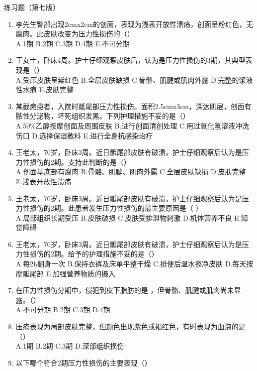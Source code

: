 \documentclass[11pt, a4paper]{ctexart}
\begin{document}
\begin{examplebox}{练习题（第七版）}
	\begin{enumerate}
		\item 李先生臀部出现2cmx2cm的创面，表现为浅表开放性溃疡，创面呈粉红色，无腐肉。此皮肤改变为压力性损伤的（\qquad）\\
		      A.1期 \quad B.2期 \quad C.3期 \quad D.4期 \quad E.不可分期
		\item 王女士，卧床4周。护士仔细观察皮肤后，认为是压力性损伤的3期，其典型表现是（\qquad）\\
		      A.受压皮肤呈紫红色 \quad B.全层皮肤缺损 \quad C.骨骼、肌腱或肌肉外露 \quad D.完整的浆液性水疱 \quad E.皮肤完整
		\item 某截瘫患者，入院时骶尾部压力性损伤。面积2.5cmx3cm，深达肌层，创面有脓性分泌物，坏死组织发黑。下列护理措施不妥的是（\qquad）\\
		      A.50\%乙醇按摩创面及周围皮肤 \quad B.进行创面清创处理 \quad C.用过氧化氢溶液冲洗伤口 \quad D.选择保湿敷料 \quad E.进行全身抗感染治疗
		\item 王老太，70岁，卧床3周。近日骶尾部皮肤有破溃，护士仔细观察后认为是压力性损伤的2期。支持此判断的是（\qquad）\\
		      A.创面基底部有腐肉 \quad B.骨骼、肌腱、肌肉外露 \quad C.全层皮肤缺损 \quad D.皮肤完整 \quad E.浅表开放性溃疡
		\item 王老太，70岁，卧床3周。近日骶尾部皮肤有破溃，护士仔细观察后认为是压力性损伤的2期。此患者发生压力性损伤的最主要原因是（ ）\\
		      A.局部组织长期受压 \quad B.皮肤破损 \quad C.皮肤受排泄物刺激 \quad D.机体营养不良 \quad E.知觉障碍
		\item 王老太，70岁，卧床3周。近日骶尾部皮肤有破溃，护士仔细观察后认为是压力性损伤的2期。给予的护理措施不妥的是（\qquad）\\
		      A.每2h翻身一次 \quad B.保持衣裤及床单平整干燥 \quad C.排便后温水擦净皮肤 \quad D.每天按摩骶尾部 \quad E.加强营养物质的摄入
		\item 在压力性损伤分期中，侵犯到皮下脂肪的是 ，但骨骼、肌腱或肌肉尚未显露。（\qquad）\\
		      A.不可分期 \quad B.2期 \quad C.3期 \quad D.4期
		\item 压疮表现为局部皮肤完整，但颜色出现紫色或褐红色，有时表现为血泡的是（\qquad）\\
		      A.1期 \quad B.2期 \quad C.3期 \quad D.深部组织损伤
		\item 以下哪个符合2期压力性损伤的主要表现（\qquad）\\

\end{enumerate}
\end{examplebox}
\end{document}
